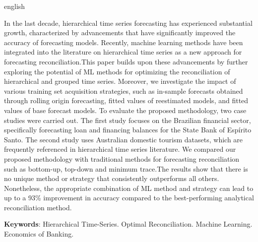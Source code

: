 \begin{resumo}[Abstract]
  \begin{otherlanguage*}{english}
    
    In the last decade, hierarchical time series forecasting has experienced substantial growth, characterized by advancements that have significantly improved the accuracy of forecasting models. Recently, machine learning methods have been integrated into the literature on hierarchical time series as a new approach for forecasting reconciliation.This paper builds upon these advancements by further exploring the potential of ML methods for optimizing the reconciliation of hierarchical and grouped time series. Moreover, we investigate the impact of various training set acquisition strategies, such as in-sample forecasts obtained through rolling origin forecasting, fitted values of reestimated models, and fitted values of base forecast models. To evaluate the proposed methodology, two case studies were carried out. The first study focuses on the Brazilian financial sector, specifically forecasting loan and financing balances for the State Bank of Espírito Santo. The second study uses Australian domestic tourism datasets, which are frequently referenced in hierarchical time series literature. We compared our proposed methodology with traditional methods for forecasting reconciliation such as bottom-up, top-down and minimum trace.The results show that there is no unique method or strategy that consistently outperforms all others. Nonetheless, the appropriate combination of ML method and strategy can lead to up to a 93\% improvement in accuracy compared to the best-performing analytical reconciliation method.
    \vspace{\onelineskip}
 
    \noindent 
    \textbf{Keywords}: Hierarchical Time-Series. Optimal Reconciliation. Machine Learning. Economics of Banking.
  \end{otherlanguage*}
\end{resumo}

\listoffigures*
\cleardoublepage


\listoftables*
\cleardoublepage


